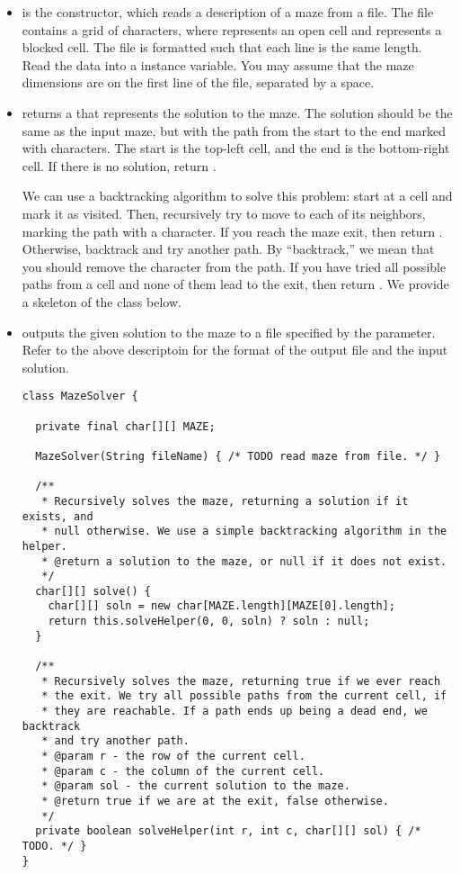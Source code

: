 \begin{itemize}
    \item {} is the constructor, which reads a description of a maze from a file. The file contains a grid of characters, where  represents an open cell and  represents a blocked cell. The file is formatted such that each line is the same length. Read the data into a  instance variable. You may assume that the maze dimensions are on the first line of the file, separated by a space.

    \item {} returns a  that represents the solution to the maze. The solution should be the same as the input maze, but with the path from the start to the end marked with  characters. The start is the top-left cell, and the end is the bottom-right cell. If there is no solution, return .

    We can use a backtracking algorithm to solve this problem: start at a cell and mark it as visited. Then, recursively try to move to each of its neighbors, marking the path with a  character. If you reach the maze exit, then return . Otherwise, backtrack and try another path. By ``backtrack,'' we mean that you should remove the  character from the path. If you have tried all possible paths from a cell and none of them lead to the exit, then return . We provide a skeleton of the class below.

    \item {} outputs the given solution to the maze to a file specified by the parameter. Refer to the above descriptoin for the format of the output file and the input  solution.

\begin{lstlisting}[language=MyJava]
class MazeSolver {

  private final char[][] MAZE;

  MazeSolver(String fileName) { /* TODO read maze from file. */ }

  /**
   * Recursively solves the maze, returning a solution if it exists, and 
   * null otherwise. We use a simple backtracking algorithm in the helper.
   * @return a solution to the maze, or null if it does not exist.
   */
  char[][] solve() {
    char[][] soln = new char[MAZE.length][MAZE[0].length];
    return this.solveHelper(0, 0, soln) ? soln : null;
  }

  /**
   * Recursively solves the maze, returning true if we ever reach
   * the exit. We try all possible paths from the current cell, if
   * they are reachable. If a path ends up being a dead end, we backtrack
   * and try another path.
   * @param r - the row of the current cell.
   * @param c - the column of the current cell.
   * @param sol - the current solution to the maze.
   * @return true if we are at the exit, false otherwise.
   */
  private boolean solveHelper(int r, int c, char[][] sol) { /* TODO. */ }
}
\end{lstlisting}
\end{itemize}

